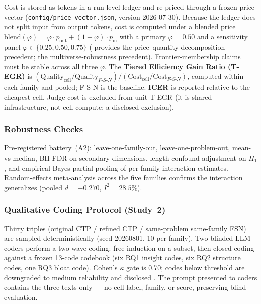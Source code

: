 \documentclass[12pt,a4paper]{article}
\newcommand{\phiBlend}{\varphi}
\begin{document}
Cost is stored as tokens in a run-level ledger and re-priced through a frozen
price vector (\texttt{config/price\_vector.json}, version 2026-07-30). Because
the ledger does not split input from output tokens, cost is computed under a
blended price $\mathrm{blend}(\phiBlend) = \phiBlend \cdot p_{\mathrm{out}} +
(1 - \phiBlend) \cdot p_{\mathrm{in}}$ with a primary $\phiBlend = 0.50$ and a
sensitivity panel $\phiBlend \in \{0.25, 0.50, 0.75\}$ (\citealt{Diewert1976}
provides the price--quantity decomposition precedent; \citealt{SteegenEtAl2016}
the multiverse-robustness precedent). Frontier-membership claims must be stable
across all three $\phiBlend$. The \textbf{Tiered Efficiency Gain Ratio (T-EGR)}
is $(\mathrm{Quality}_{\mathrm{cell}} / \mathrm{Quality}_{F\text{-}S\text{-}N})
/ (\mathrm{Cost}_{\mathrm{cell}} / \mathrm{Cost}_{F\text{-}S\text{-}N})$,
computed within each family and pooled; F-S-N is the baseline. \textbf{ICER} is
reported relative to the cheapest cell. Judge cost is excluded from unit T-EGR
(it is shared infrastructure, not cell compute; a disclosed exclusion).

\subsubsection{Robustness Checks}

Pre-registered battery~(A2): leave-one-family-out, leave-one-problem-out,
mean-vs-median, BH-FDR on secondary dimensions, length-confound adjustment on
$H_1$, and empirical-Bayes partial pooling of per-family interaction estimates.
Random-effects meta-analysis across the five families confirms the interaction
generalizes (pooled $d = -0.270$, $I^2 = 28.5\%$).

\subsubsection{Qualitative Coding Protocol (Study~2)}\label{sec:qual-coding}

Thirty triples (original CTP / refined CTP / same-problem same-family FSN) are
sampled deterministically (seed 20260801, 10 per family). Two blinded LLM coders
perform a two-wave coding: free induction on a subset, then closed coding
against a frozen 13-code codebook (six RQ1 insight codes, six RQ2 structure
codes, one RQ3 bloat code). Cohen's $\kappa$ gate is 0.70; codes below threshold
are downgraded to medium reliability and disclosed \citep{Cohen1960}. The prompt
presented to coders contains the three texts only --- no cell label, family, or
score, preserving blind evaluation.
\end{document}
